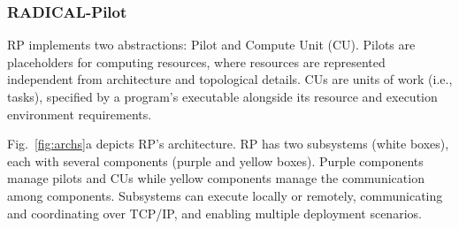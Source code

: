 \documentclass[preprint,12pt, a4paper]{elsarticle}
\begin{document}
\subsubsection{RADICAL-Pilot}\label{sssec:arch_rp}

RP implements two abstractions: Pilot and Compute Unit (CU). 
Pilots are placeholders for computing resources, where resources are
represented independent from architecture and topological details. CUs are
units of work (i.e., tasks), specified by a program's executable alongside
its resource and execution environment requirements.

Fig.~\ref{fig:archs}a depicts RP's architecture. RP has two subsystems (white
boxes), each with several components (purple and yellow boxes). 
Purple components manage pilots and CUs while yellow components manage the
communication among components. Subsystems can execute locally or remotely,
communicating and coordinating over TCP/IP, and enabling multiple deployment
scenarios.

\end{document}
